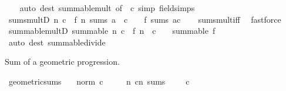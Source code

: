 \begin{isabellebody}
%
\isadelimproof
\ \ %
\endisadelimproof
%
\isatagproof
{}\isamarkupfalse%
\ {\isacharparenleft}{\kern0pt}auto\ dest{\isacharcolon}{\kern0pt}\ summable{\isacharunderscore}{\kern0pt}mult\ {\isacharbrackleft}{\kern0pt}of\ {\isacharunderscore}{\kern0pt}\ c{\isacharbrackright}{\kern0pt}\ simp{\isacharcolon}{\kern0pt}\ field{\isacharunderscore}{\kern0pt}simps{\isacharparenright}{\kern0pt}%
\endisatagproof
{\isafoldproof}%
%
\isadelimproof
\isanewline
%
\endisadelimproof
\isanewline
{}\isamarkupfalse%
\ sums{\isacharunderscore}{\kern0pt}mult{\isacharunderscore}{\kern0pt}D{\isacharcolon}{\kern0pt}\ {\isachardoublequoteopen}{\isacharparenleft}{\kern0pt}{\isasymlambda}n{\isachardot}{\kern0pt}\ c\ {\isacharasterisk}{\kern0pt}\ f\ n{\isacharparenright}{\kern0pt}\ sums\ a\ {\isasymLongrightarrow}\ c\ {\isasymnoteq}\ {}\ {\isasymLongrightarrow}\ f\ sums\ {\isacharparenleft}{\kern0pt}a{\isacharslash}{\kern0pt}c{\isacharparenright}{\kern0pt}{\isachardoublequoteclose}\isanewline
%
\isadelimproof
\ \ %
\endisadelimproof
%
\isatagproof
{}\isamarkupfalse%
\ sums{\isacharunderscore}{\kern0pt}mult{\isacharunderscore}{\kern0pt}iff\ \isamarkupfalse%
\ fastforce%
\endisatagproof
{\isafoldproof}%
%
\isadelimproof
\isanewline
%
\endisadelimproof
\isanewline
{}\isamarkupfalse%
\ summable{\isacharunderscore}{\kern0pt}mult{\isacharunderscore}{\kern0pt}D{\isacharcolon}{\kern0pt}\ {\isachardoublequoteopen}summable\ {\isacharparenleft}{\kern0pt}{\isasymlambda}n{\isachardot}{\kern0pt}\ c\ {\isacharasterisk}{\kern0pt}\ f\ n{\isacharparenright}{\kern0pt}\ {\isasymLongrightarrow}\ c\ {\isasymnoteq}\ {}\ {\isasymLongrightarrow}\ summable\ f{\isachardoublequoteclose}\isanewline
%
\isadelimproof
\ \ %
\endisadelimproof
%
\isatagproof
{}\isamarkupfalse%
\ {\isacharparenleft}{\kern0pt}auto\ dest{\isacharcolon}{\kern0pt}\ summable{\isacharunderscore}{\kern0pt}divide{\isacharparenright}{\kern0pt}%
\endisatagproof
{\isafoldproof}%
%
\isadelimproof
%
\endisadelimproof
%
\begin{isamarkuptext}%
Sum of a geometric progression.%
\end{isamarkuptext}\isamarkuptrue%
\isamarkupfalse%
\ geometric{\isacharunderscore}{\kern0pt}sums{\isacharcolon}{\kern0pt}\isanewline
\ \ \ {\isachardoublequoteopen}norm\ c\ {\isacharless}{\kern0pt}\ {}{\isachardoublequoteclose}\isanewline
\ \ \ {\isachardoublequoteopen}{\isacharparenleft}{\kern0pt}{\isasymlambda}n{\isachardot}{\kern0pt}\ c{\isacharcircum}{\kern0pt}n{\isacharparenright}{\kern0pt}\ sums\ {\isacharparenleft}{\kern0pt}{}\ {\isacharslash}{\kern0pt}\ {\isacharparenleft}{\kern0pt}{}\ {\isacharminus}{\kern0pt}\ c{\isacharparenright}{\kern0pt}{\isacharparenright}{\kern0pt}{\isachardoublequoteclose}\isanewline

\end{isabellebody}
